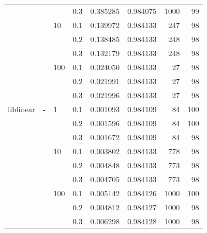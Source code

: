 \begin{table}[H]
\begin{tabular}{llllrrrr}
          &   &     & 0.3 &  0.385285 &  0.984075 &    1000 &    99 \\
          &   & 10  & 0.1 &  0.139972 &  0.984133 &     247 &    98 \\
          &   &     & 0.2 &  0.138485 &  0.984133 &     248 &    98 \\
          &   &     & 0.3 &  0.132179 &  0.984133 &     248 &    98 \\
          &   & 100 & 0.1 &  0.024050 &  0.984133 &      27 &    98 \\
          &   &     & 0.2 &  0.021991 &  0.984133 &      27 &    98 \\
          &   &     & 0.3 &  0.021996 &  0.984133 &      27 &    98 \\
liblinear & - & 1   & 0.1 &  0.001093 &  0.984109 &      84 &   100 \\
          &   &     & 0.2 &  0.001596 &  0.984109 &      84 &   100 \\
          &   &     & 0.3 &  0.001672 &  0.984109 &      84 &    98 \\
          &   & 10  & 0.1 &  0.003802 &  0.984133 &     778 &    98 \\
          &   &     & 0.2 &  0.004848 &  0.984133 &     773 &    98 \\
          &   &     & 0.3 &  0.004705 &  0.984133 &     773 &    98 \\
          &   & 100 & 0.1 &  0.005142 &  0.984126 &    1000 &   100 \\
          &   &     & 0.2 &  0.004812 &  0.984127 &    1000 &    98 \\
          &   &     & 0.3 &  0.006298 &  0.984128 &    1000 &    98 \\
\bottomrule
\end{tabular}
\end{table}

